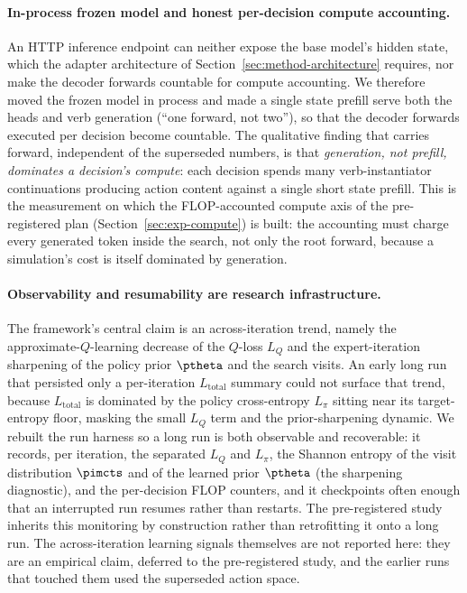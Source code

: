 \paragraph{In-process frozen model and honest per-decision compute accounting.}
An HTTP inference endpoint can neither expose the base model's hidden state,
which the adapter architecture of Section~\ref{sec:method-architecture}
requires, nor make the decoder forwards countable for compute accounting. We
therefore moved the frozen model in process and made a single state prefill
serve both the heads and verb generation (``one forward, not two''), so that the
decoder forwards executed per decision become countable. The qualitative finding
that carries forward, independent of the superseded numbers, is that
\emph{generation, not prefill, dominates a decision's compute}: each decision
spends many verb-instantiator continuations producing action content against a
single short state prefill. This is the measurement on which the FLOP-accounted
compute axis of the pre-registered plan (Section~\ref{sec:exp-compute}) is
built: the accounting must charge every generated token inside the search, not
only the root forward, because a simulation's cost is itself dominated by
generation.

\paragraph{Observability and resumability are research infrastructure.}
The framework's central claim is an across-iteration trend, namely the
approximate-$Q$-learning decrease of the $Q$-loss $L_Q$ and the
expert-iteration sharpening of the policy prior $\ptheta$ and the search visits.
An early long run that persisted only a per-iteration $L_{\mathrm{total}}$
summary could not surface that trend, because $L_{\mathrm{total}}$ is dominated
by the policy cross-entropy $L_{\pi}$ sitting near its target-entropy floor,
masking the small $L_Q$ term and the prior-sharpening dynamic. We rebuilt the
run harness so a long run is both observable and recoverable: it records, per
iteration, the separated $L_Q$ and $L_{\pi}$, the Shannon entropy of the visit
distribution $\pimcts$ and of the learned prior $\ptheta$ (the sharpening
diagnostic), and the per-decision FLOP counters, and it checkpoints often enough
that an interrupted run resumes rather than restarts. The pre-registered study
inherits this monitoring by construction rather than retrofitting it onto a long
run. The across-iteration learning signals themselves are not reported here:
they are an empirical claim, deferred to the pre-registered study, and the
earlier runs that touched them used the superseded action space.

